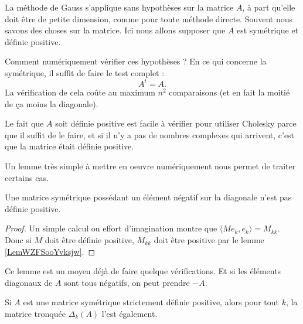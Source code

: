 La méthode de Gauss s'applique sans hypothèses sur la matrice \( A\), à part qu'elle doit être de petite dimension, comme pour toute méthode directe. Souvent nous savons des choses sur la matrice. Ici nous allons supposer que \( A\) est symétrique et définie positive.

Comment numériquement vérifier ces hypothèses ? En ce qui concerne la symétrique, il suffit de faire le test complet :
\begin{equation}
    A^t=A.
\end{equation}
La vérification de cela coûte au maximum \( n^2\) comparaisons (et en fait la moitié de ça moins la diagonale). 

Le fait que \( A\) soit définie positive est facile à vérifier pour utiliser Cholesky parce que il suffit de le faire, et si il n'y a pas de nombres complexes qui arrivent, c'est que la matrice était définie positive.

Un lemme très simple à mettre en oeuvre numériquement nous permet de traiter certains cas.
\begin{lemma}
    Une matrice symétrique possédant un élément négatif sur la diagonale n'est pas définie positive.
\end{lemma}

\begin{proof}
    Un simple calcul ou effort d'imagination montre que \( \langle Me_k, e_k\rangle =M_{kk}\). Donc si \( M\) doit être définie positive, \( M_{kk}\) doit être positive par le lemme \ref{LemWZFSooYvksjw}.
\end{proof}
Ce lemme est un moyen déjà de faire quelque vérifications. Et si les éléments diagonaux de \( A\) sont tous négatifs, on peut prendre \( -A\).

\begin{lemma}       \label{LEMooVEIYooZbShQb}
    Si \( A\) est une matrice symétrique strictement définie positive, alors pour tout \( k\), la matrice tronquée \( \Delta_k(A)\) l'est également.    
\end{lemma}

